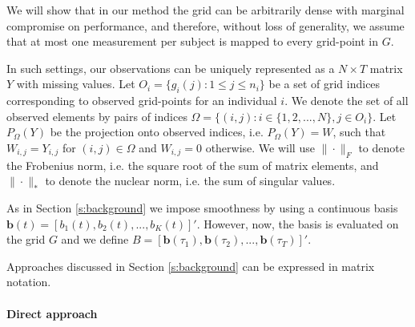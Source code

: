 \documentclass[preprint]{imsart}
\numberwithin{equation}{section}
\theoremstyle{plain}
\newcommand{\bb}{\mathbf{b}}
\begin{document}
We will show that in our method the grid can be arbitrarily dense with marginal compromise on performance, and therefore, without loss of generality, we assume that at most one measurement per subject is mapped to every grid-point in $G$.

In such settings, our observations can be uniquely represented as a $N \times T$ matrix $Y$ with missing values. Let $O_i = \{g_i(j): 1 \leq j \leq n_i \}$ be a set of grid indices corresponding to observed grid-points for an individual $i$. We denote the set of all observed elements by pairs of indices $\Omega = \{ (i,j) : i\in \{1,2,...,N\}, j \in O_i \}$. Let $P_\Omega(Y)$ be the projection onto observed indices, i.e. $P_\Omega(Y) = W$, such that $W_{i,j} = Y_{i,j}$ for $(i,j) \in \Omega$ and $W_{i,j} = 0$ otherwise. We will use $\|\cdot\|_F$ to denote the Frobenius norm, i.e. the square root of the sum of matrix elements, and $\|\cdot\|_*$ to denote the nuclear norm, i.e. the sum of singular values.

As in Section \ref{s:background} we impose smoothness by using a continuous basis $\bb(t) = [b_1(t),b_2(t),...,b_K(t)]'$. However, now, the basis is evaluated on the grid $G$ and we define $B = [\bb(\tau_1),\bb(\tau_2),...,\bb(\tau_T)]'$.

Approaches discussed in Section \ref{s:background} can be expressed in matrix notation.

\paragraph{Direct approach}
\end{document}
